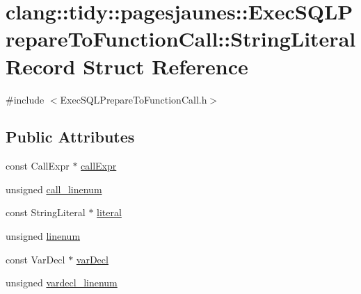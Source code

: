 \hypertarget{structclang_1_1tidy_1_1pagesjaunes_1_1_exec_s_q_l_prepare_to_function_call_1_1_string_literal_record}{}\section{clang\+:\+:tidy\+:\+:pagesjaunes\+:\+:Exec\+S\+Q\+L\+Prepare\+To\+Function\+Call\+:\+:String\+Literal\+Record Struct Reference}
\label{structclang_1_1tidy_1_1pagesjaunes_1_1_exec_s_q_l_prepare_to_function_call_1_1_string_literal_record}


{\ttfamily \#include $<$Exec\+S\+Q\+L\+Prepare\+To\+Function\+Call.\+h$>$}

\subsection*{Public Attributes}
\begin{DoxyCompactItemize}
\item 
const Call\+Expr $\ast$ \hyperlink{structclang_1_1tidy_1_1pagesjaunes_1_1_exec_s_q_l_prepare_to_function_call_1_1_string_literal_record_a3e07286a208ed32088d64e4f58c14b6a}{call\+Expr}
\item 
unsigned \hyperlink{structclang_1_1tidy_1_1pagesjaunes_1_1_exec_s_q_l_prepare_to_function_call_1_1_string_literal_record_a65cd36bc3058089bb3f77c4552919ba2}{call\+\_\+linenum}
\item 
const String\+Literal $\ast$ \hyperlink{structclang_1_1tidy_1_1pagesjaunes_1_1_exec_s_q_l_prepare_to_function_call_1_1_string_literal_record_aca0aa729dd7db983351220b19d27ea78}{literal}
\item 
unsigned \hyperlink{structclang_1_1tidy_1_1pagesjaunes_1_1_exec_s_q_l_prepare_to_function_call_1_1_string_literal_record_a5cf54f47bfdaa4be14da55c68fb2df79}{linenum}
\item 
const Var\+Decl $\ast$ \hyperlink{structclang_1_1tidy_1_1pagesjaunes_1_1_exec_s_q_l_prepare_to_function_call_1_1_string_literal_record_ae38f36acf26abf914738467687366f15}{var\+Decl}
\item 
unsigned \hyperlink{structclang_1_1tidy_1_1pagesjaunes_1_1_exec_s_q_l_prepare_to_function_call_1_1_string_literal_record_a1761892c3a10f6615e22b67ecd16ae17}{vardecl\+\_\+linenum}
\end{DoxyCompactItemize}


